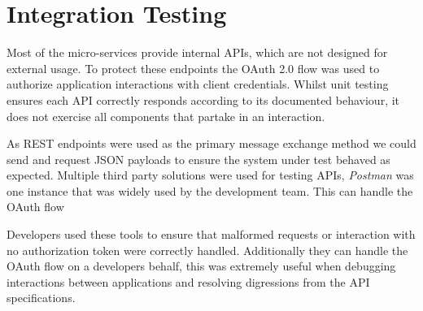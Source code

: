 \section{Integration Testing}
\par
Most of the micro-services provide internal APIs, which are not designed for external usage. To protect these endpoints the OAuth 2.0 flow was used to authorize application interactions with client credentials. Whilst unit testing ensures each API correctly responds according to its documented behaviour, it does not exercise all components that partake in an interaction.

\par
As REST endpoints were used as the primary message exchange method we could send and request JSON payloads to ensure the system under test behaved as expected. Multiple third party solutions were used for testing APIs, \textit{Postman}\cite{Postman} was one instance that was widely used by the development team. 
This can handle the OAuth flow 

\par
Developers used these tools to ensure that malformed requests or interaction with no authorization token were correctly handled. Additionally they can handle the OAuth flow on a developers behalf, this was extremely useful when debugging interactions between applications and resolving digressions from the API specifications.
